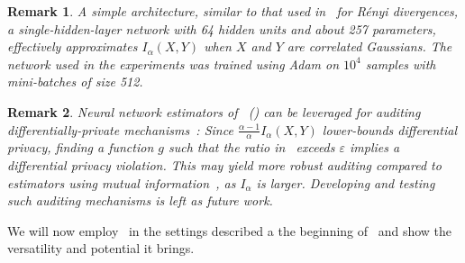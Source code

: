 \documentclass{article}
\numberwithin{theorem}{section}
\numberwithin{example}{section}
\newtheorem{remark}{Remark}
\numberwithin{remark}{section}
\numberwithin{definition}{section}
\begin{document}
{\begin{remark}
A simple architecture, similar to that used in~\cite{Birrell:21} for Rényi divergences, a single-hidden-layer network with 64 hidden units and about 257 parameters, effectively approximates $I_\alpha(X, Y)$ when $X$ and $Y$ are correlated Gaussians. The network used in the experiments was trained using Adam on $10^4$ samples with mini-batches of size 512.

\end{remark}

\begin{remark}
    Neural network estimators of~ () can be leveraged for auditing differentially-private mechanisms~\cite{domingo2022auditing,nuradha2023pufferfish,koskela2024auditing,muthu2024nearly}: Since $\frac{\alpha-1}{\alpha} I_\alpha(X,Y)$ lower-bounds differential privacy, finding a function $g$ such that the ratio in~ exceeds $\varepsilon$ implies a differential privacy violation. This may yield more robust auditing compared to estimators using mutual information~\cite{nuradha2023pufferfish}, as $I_\alpha$ is larger. Developing and testing such auditing mechanisms is left as future work.
\end{remark}

}
We will now employ~ in the settings described a the beginning of~ and show the versatility and potential it brings.



 




\end{document}

